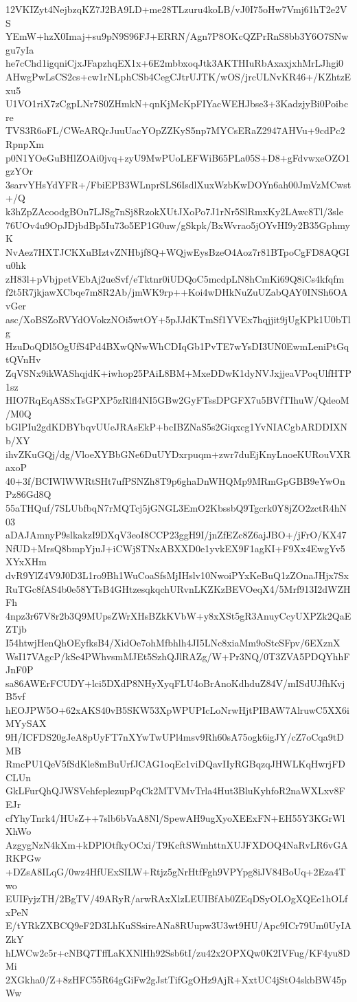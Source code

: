 12VKIZyt4NejbzqKZ7J2BA9LD+me28TLzuru4koLB/vJ0I75oHw7Vmj61hT2e2VS
YEmW+hzX0Imaj+su9pN9S96FJ+ERRN/Agn7P8OKcQZPrRnS8bb3Y6O7SNwgu7yIa
he7cChd1igqniCjxJFapzhqEX1x+6E2mbbxoqJtk3AKTHIuRbAxaxjxhMrLJhgi0
AHwgPwLsCS2cs+cw1rNLphCSb4CegCJtrUJTK/wOS/jrcULNvKR46+/KZhtzExu5
U1VO1riX7zCgpLNr7S0ZHmkN+qnKjMcKpFIYacWEHJbse3+3KadzjyBi0Poibcre
TVS3R6oFL/CWeARQrJuuUacYOpZZKyS5np7MYCsERaZ2947AHVu+9cdPc2RpnpXm
p0N1YOeGuBHlZOAi0jvq+zyU9MwPUoLEFWiB65PLa05S+D8+gFdvwxeOZO1gzYOr
3sarvYHsYdYFR+/FbiEPB3WLnprSLS6IsdlXuxWzbKwDOYn6ah00JmVzMCwst+/Q
k3hZpZAcoodgBOn7LJSg7nSj8RzokXUtJXoPo7J1rNr5SlRmxKy2LAwc8Tl/3sle
76UOv4u9OpJDjbdBp5Iu73o5EP1G0uw/gSkpk/BxWvrao5jOYvHI9y2B35GphmyK
NvAez7HXTJCKXuBIztvZNHbjf8Q+WQjwEysBzeO4Aoz7r81BTpoCgFD8AQGIu0hk
zH83l+pVbjpetVEbAj2ueSvf/eTktnr0iUDQoC5mcdpLN8hCmKi69Q8iCs4kfqfm
f2t5R7jkjawXCbqe7m8R2Ab/jmWK9rp++Koi4wDHkNuZuUZabQAY0INSh6OAvGer
asc/XoBSZoRVYdOVokzNOi5wtOY+5pJJdKTmSf1YVEx7hqjjit9jUgKPk1U0bTlg
HzuDoQDl5OgUfS4Pd4BXwQNwWhCDIqGb1PvTE7wYsDI3UN0EwmLeniPtGqtQVnHv
ZqVSNx9ikWAShqjdK+iwhop25PAiL8BM+MxeDDwK1dyNVJxjjeaVPoqUlfHTP1sz
HIO7RqEqASSxTsGPXP5zRlfl4NI5GBw2GyFTssDPGFX7u5BVfTIhuW/QdeoM/M0Q
bGlPIu2gdKDBYbqvUUeJRAsEkP+bcIBZNaS5s2Giqxcg1YvNIACgbARDDIXNb/XY
ihvZKuGQj/dg/VloeXYBbGNe6DuUYDxrpuqm+zwr7duEjKnyLnoeKURouVXRaxoP
40+3f/BCIWlWWRtSHt7ufPSNZh8T9p6ghaDnWHQMp9MRmGpGBB9eYwOnPz86Gd8Q
55aTHQuf/7SLUbfbqN7rMQTcj5jGNGL3EmO2KbssbQ9Tgcrk0Y8jZO2zctR4hN03
aDAJAmnyP9slkakzI9DXqV3eoI8CCP23ggH9I/jnZfEZc8Z6ajJBO+/jFrO/KX47
NfUD+MrsQ8bmpYjuJ+iCWjSTNxABXXD0e1yvkEX9F1agKI+F9Xx4EwgYv5XYxXHm
dvR9YlZ4V9J0D3L1ro9Bh1WuCoaSfsMjIHslv10NwoiPYxKeBuQ1zZOnaJHjx7Sx
RuTGc8fAS4b0e58YTsB4GHtzesqkqchURvnLKZKzBEVOeqX4/5Mrf913I2dWZHFh
4npz3r67V8r2b3Q9MUpsZWrXHsBZkKVbW+y8xXSt5gR3AnuyCcyUXPZk2QaEZTjb
I54htwjHenQhOEyfksB4/XidOe7ohMfbhlh4JI5LNc8xiaMm9oStcSFpv/6EXznX
WsI17VAgcP/kSe4PWhvsmMJEt5SzhQJlRAZg/W+Pr3NQ/0T3ZVA5PDQYhhFJnF0P
sa86AWErFCUDY+lci5DXdP8NHyXyqFLU4oBrAnoKdhduZ84V/mISdUJfhKvjB5vf
hEOJPW5O+62xAKS40vB5SKW53XpWPUPIcLoNrwHjtPIBAW7AlruwC5XX6iMYySAX
9H/ICFDS20gJeA8pUyFT7nXYwTwUPl4msv9Rh60sA75ogk6igJY/cZ7oCqa9tDMB
RmcPU1QeV5fSdKle8mBuUrfJCAG1oqEc1viDQavIIyRGBqzqJHWLKqHwrjFDCLUn
GkLFurQhQJWSVehfeplezupPqCk2MTVMvTrla4Hut3BluKyhfoR2naWXLxv8FEJr
cfYhyTnrk4/HUsZ++7slb6bVaA8Nl/SpewAH9ugXyoXEExFN+EH55Y3KGrWlXhWo
AzgygNzN4kXm+kDPlOtfkyOCxi/T9KcftSWmhttnXUJFXDOQ4NaRvLR6vGARKPGw
+DZsA8ILqG/0wz4HfUExSILW+Rtjz5gNrHtfFgh9VPYpg8iJV84BoUq+2Eza4Two
EUIFyjzTH/2BgTV/49ARyR/arwRAxXlzLEUIBfAb0ZEqDSyOLOgXQEe1hOLfxPeN
E/tYRkZXBCQ9eF2D3LhKuSSsireANa8RUupw3U3wt9HU/Apc9ICr79Um0UyIAZkY
hLWCw2c5r+cNBQ7TffLaKXNlHh92Ssb6tI/zu42x2OPXQw0K2IVFug/KF4yu8DMi
2XGkha0/Z+8zHFC55R64gGiFw2gJstTifGgOHz9AjR+XxtUC4jStO4skbBW45pWw
